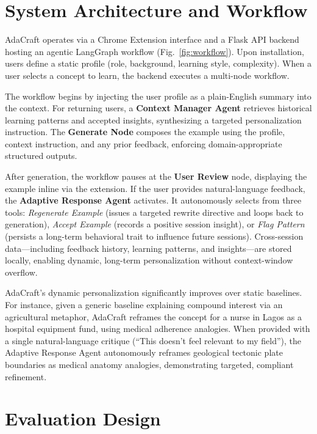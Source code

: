 \documentclass[conference]{IEEEtran}
\begin{document}
\section{System Architecture and Workflow}
\label{sec:system_workflow}

AdaCraft operates via a Chrome Extension interface and a Flask API backend hosting an agentic LangGraph workflow (Fig.~\ref{fig:workflow}). Upon installation, users define a static profile (role, background, learning style, complexity). When a user selects a concept to learn, the backend executes a multi-node workflow.

The workflow begins by injecting the user profile as a plain-English summary into the context. For returning users, a \textbf{Context Manager Agent} retrieves historical learning patterns and accepted insights, synthesizing a targeted personalization instruction. The \textbf{Generate Node} composes the example using the profile, context instruction, and any prior feedback, enforcing domain-appropriate structured outputs. 

After generation, the workflow pauses at the \textbf{User Review} node, displaying the example inline via the extension. If the user provides natural-language feedback, the \textbf{Adaptive Response Agent} activates. It autonomously selects from three tools: \textit{Regenerate Example} (issues a targeted rewrite directive and loops back to generation), \textit{Accept Example} (records a positive session insight), or \textit{Flag Pattern} (persists a long-term behavioral trait to influence future sessions). Cross-session data—including feedback history, learning patterns, and insights—are stored locally, enabling dynamic, long-term personalization without context-window overflow.

AdaCraft's dynamic personalization significantly improves over static baselines. For instance, given a generic baseline explaining compound interest via an agricultural metaphor, AdaCraft reframes the concept for a nurse in Lagos as a hospital equipment fund, using medical adherence analogies. When provided with a single natural-language critique (``This doesn't feel relevant to my field''), the Adaptive Response Agent autonomously reframes geological tectonic plate boundaries as medical anatomy analogies, demonstrating targeted, compliant refinement.

\section{Evaluation Design}
\label{sec:evaluation}
\end{document}
